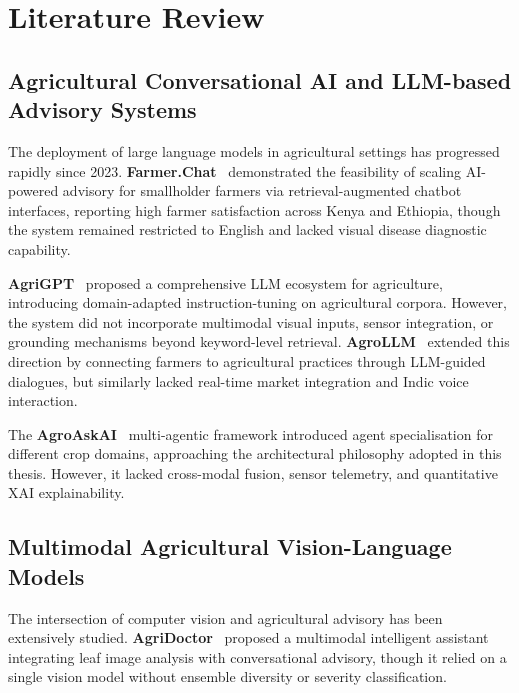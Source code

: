 \documentclass[12pt,a4paper]{article}
\newlength{\defbaselineskip}
\newcommand{\setlinespacing}[1]{\setlength{\baselineskip}{#1 \defbaselineskip}}
\begin{document}
\clearpage
\section{Literature Review}
\setlinespacing{1.20}

\subsection{Agricultural Conversational AI and LLM-based Advisory Systems}

The deployment of large language models in agricultural settings has progressed rapidly since 2023. \textbf{Farmer.Chat}~\cite{farmerchat2024} demonstrated the feasibility of scaling AI-powered advisory for smallholder farmers via retrieval-augmented chatbot interfaces, reporting high farmer satisfaction across Kenya and Ethiopia, though the system remained restricted to English and lacked visual disease diagnostic capability.

\textbf{AgriGPT}~\cite{agrigpt2025} proposed a comprehensive LLM ecosystem for agriculture, introducing domain-adapted instruction-tuning on agricultural corpora. However, the system did not incorporate multimodal visual inputs, sensor integration, or grounding mechanisms beyond keyword-level retrieval. \textbf{AgroLLM}~\cite{agrollm2025} extended this direction by connecting farmers to agricultural practices through LLM-guided dialogues, but similarly lacked real-time market integration and Indic voice interaction.

The \textbf{AgroAskAI}~\cite{agroaskai2024} multi-agentic framework introduced agent specialisation for different crop domains, approaching the architectural philosophy adopted in this thesis. However, it lacked cross-modal fusion, sensor telemetry, and quantitative XAI explainability.

\subsection{Multimodal Agricultural Vision-Language Models}

The intersection of computer vision and agricultural advisory has been extensively studied. \textbf{AgriDoctor}~\cite{agridoctor2025} proposed a multimodal intelligent assistant integrating leaf image analysis with conversational advisory, though it relied on a single vision model without ensemble diversity or severity classification.
\end{document}
